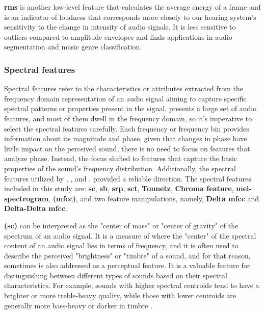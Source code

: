 \textbf{\gls{rms}} is another low-level feature that calculates the average energy of a frame and is an indicator of loudness that corresponds more closely to our hearing system’s sensitivity to the change in intensity of audio signals. It is less sensitive to outliers compared to amplitude envelopes and finds applications in audio segmentation and music genre classification. 


\subsubsection{Spectral features}
\label{subsubsec:spectral_fatures}

Spectral features refer to the characteristics or attributes extracted from the frequency domain representation of an audio signal aiming to capture specific spectral patterns or properties present in the signal. \textcite{Peeters2004} presents a large set of audio features, and most of them dwell in the frequency domain, so it's imperative to select the spectral features carefully. Each frequency or frequency bin provides information about its magnitude and phase, given that changes in phase have little impact on the perceived sound, there is no need to focus on features that analyze phase. Instead, the focus shifted to features that capture the basic properties of the sound's frequency distribution. Additionally, the spectral features utilized by \textcite{Lhoest2021}, \textcite{Silva2019}, and \textcite{Bountourakis2015}, provided a reliable direction. The spectral features included in this study are: \textbf{\gls{sc}}, \textbf{\gls{sb}}, \textbf{\gls{srp}}, \textbf{\gls{sct}}, \textbf{Tonnetz}, \textbf{Chroma feature}, \textbf{mel-spectrogram}, \textbf{ (\gls{mfcc})}, and two feature manipulations, namely, \textbf{Delta \gls{mfcc}} and \textbf{Delta-Delta \gls{mfcc}}.

\textbf{ (\gls{sc})} can be interpreted as the "center of mass" or "center of gravity" of the spectrum of an audio signal. It is a measure of where the "center" of the spectral content of an audio signal lies in terms of frequency, and it is often used to describe the perceived "brightness" or "timbre" of a sound, and for that reason, sometimes is also addressed as a perceptual feature. It is a valuable feature for distinguishing between different types of sounds based on their spectral characteristics. %
For example, sounds with higher spectral centroids tend to have a brighter or more treble-heavy quality, while those with lower centroids are generally more bass-heavy or darker in timbre \cite{Park2008}.

